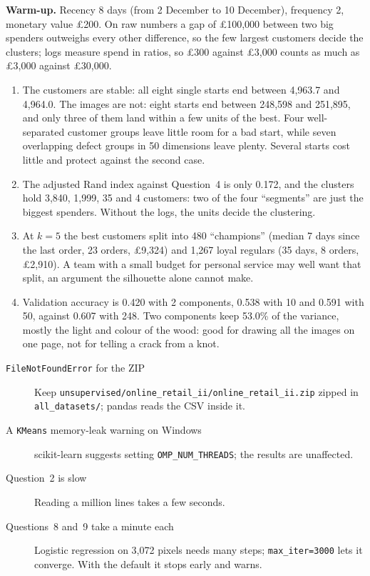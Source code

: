 \begin{expectedfindings}
\textbf{Warm-up.} Recency 8 days (from 2 December to 10 December), frequency 2, monetary value \pounds 200. On raw numbers a gap of \pounds 100,000 between two big spenders outweighs every other difference, so the few largest customers decide the clusters; logs measure spend in ratios, so \pounds 300 against \pounds 3,000 counts as much as \pounds 3,000 against \pounds 30,000.
\begin{enumerate}
  \item The customers are stable: all eight single starts end between 4,963.7 and 4,964.0. The images are not: eight starts end between 248,598 and 251,895, and only three of them land within a few units of the best. Four well-separated customer groups leave little room for a bad start, while seven overlapping defect groups in 50 dimensions leave plenty. Several starts cost little and protect against the second case.
  \item The adjusted Rand index against Question~4 is only 0.172, and the clusters hold 3,840, 1,999, 35 and 4 customers: two of the four ``segments'' are just the biggest spenders. Without the logs, the units decide the clustering.
  \item At $k=5$ the best customers split into 480 ``champions'' (median 7 days since the last order, 23 orders, \pounds 9,324) and 1,267 loyal regulars (35 days, 8 orders, \pounds 2,910). A team with a small budget for personal service may well want that split, an argument the silhouette alone cannot make.
  \item Validation accuracy is 0.420 with 2 components, 0.538 with 10 and 0.591 with 50, against 0.607 with 248. Two components keep 53.0\% of the variance, mostly the light and colour of the wood: good for drawing all the images on one page, not for telling a crack from a knot.
\end{enumerate}
\end{expectedfindings}

\begin{troubleshoot}
\begin{description}
  \item[\texttt{FileNotFoundError} for the ZIP] Keep \texttt{unsupervised/\allowbreak online\_retail\_ii/\allowbreak online\_retail\_ii.zip} zipped in \texttt{all\_datasets/}; pandas reads the CSV inside it.
  \item[A \texttt{KMeans} memory-leak warning on Windows] scikit-learn suggests setting \texttt{OMP\_NUM\_THREADS}; the results are unaffected.
  \item[Question~2 is slow] Reading a million lines takes a few seconds.
  \item[Questions~8 and~9 take a minute each] Logistic regression on 3,072 pixels needs many steps; \texttt{max\_iter=3000} lets it converge. With the default it stops early and warns.
\end{description}
\end{troubleshoot}

